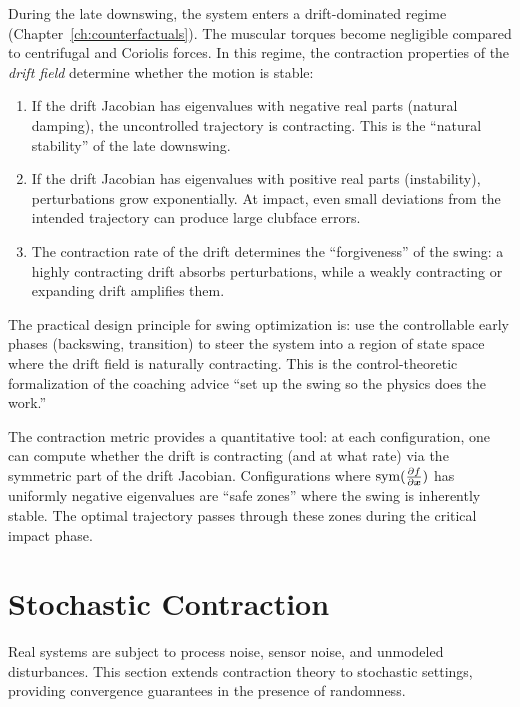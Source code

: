 During the late downswing, the system enters a drift-dominated regime
(Chapter~\ref{ch:counterfactuals}). The muscular torques become negligible compared
to centrifugal and Coriolis forces. In this regime, the contraction properties of the
\emph{drift field} determine whether the motion is stable:

\begin{enumerate}
\item If the drift Jacobian has eigenvalues with negative real parts (natural damping),
      the uncontrolled trajectory is contracting. This is the ``natural stability''
      of the late downswing.
\item If the drift Jacobian has eigenvalues with positive real parts (instability),
      perturbations grow exponentially. At impact, even small deviations from the
      intended trajectory can produce large clubface errors.
\item The contraction rate of the drift determines the ``forgiveness'' of the swing:
      a highly contracting drift absorbs perturbations, while a weakly contracting or
      expanding drift amplifies them.
\end{enumerate}

\begin{designbox}
The practical design principle for swing optimization is: use the controllable early
phases (backswing, transition) to steer the system into a region of state space where
the drift field is naturally contracting. This is the control-theoretic formalization
of the coaching advice ``set up the swing so the physics does the work.''

The contraction metric provides a quantitative tool: at each configuration, one can
compute whether the drift is contracting (and at what rate) via the symmetric part
of the drift Jacobian. Configurations where $\operatorname{sym}(\frac{\partial f}{\partial \bm{x}})$
has uniformly negative eigenvalues are ``safe zones'' where the swing is inherently
stable. The optimal trajectory passes through these zones during the critical
impact phase.
\end{designbox}


\section{Stochastic Contraction}

Real systems are subject to process noise, sensor noise, and unmodeled disturbances. This
section extends contraction theory to stochastic settings, providing convergence guarantees
in the presence of randomness.

